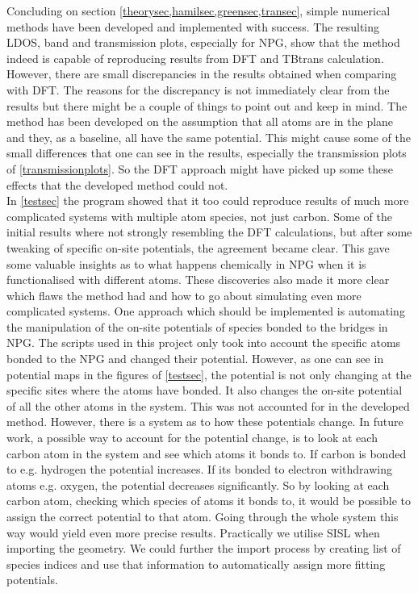 Concluding on section \cref{theorysec,hamilsec,greensec,transec}, simple numerical methods have been developed and implemented with success. The resulting LDOS, band and transmission plots, especially for NPG, show that the method indeed is capable of reproducing results from DFT and TBtrans calculation. However, there are small discrepancies in the results obtained when comparing with DFT. The reasons for the discrepancy is not immediately clear from the results but there might be a couple of things to point out and keep in mind. The method has been developed on the assumption that all atoms are in the plane and they, as a baseline, all have the same potential. This might cause some of the small differences that one can see in the results, especially the transmission plots of \cref{transmissionplots}. So the DFT approach might have picked up some these effects that the developed method could not.\\
In \cref{testsec} the program showed that it too could reproduce results of much more complicated systems with multiple atom species, not just carbon. Some of the initial results where not strongly resembling the DFT calculations, but after some tweaking of specific on-site potentials, the agreement became clear. This gave some valuable insights as to what happens chemically in NPG when it is functionalised with different atoms. These discoveries also made it more clear which flaws the method had and how to go about simulating even more complicated systems. One approach which should be implemented is automating the manipulation of the on-site potentials of species bonded to the bridges in NPG. The scripts used in this project only took into account the specific atoms bonded to the NPG and changed their potential. However, as one can see in potential maps in the figures of \cref{testsec}, the potential is not only changing at the specific sites where the atoms have bonded. It also changes the on-site potential of all the other atoms in the system. This was not accounted for in the developed method. However, there is a system as to how these potentials change. In future work, a possible way to account for the potential change, is to look at each carbon atom in the system and see which atoms it bonds to. If carbon is bonded to e.g. hydrogen the potential increases. If its bonded to electron withdrawing atoms e.g. oxygen, the potential decreases significantly. So by looking at each carbon atom, checking which species of atoms it bonds to, it would be possible to assign the correct potential to that atom. Going through the whole system this way would yield even more precise results. Practically we utilise SISL when importing the geometry. We could further the import process by creating list of species indices and use that information to automatically assign more fitting potentials.\newline
